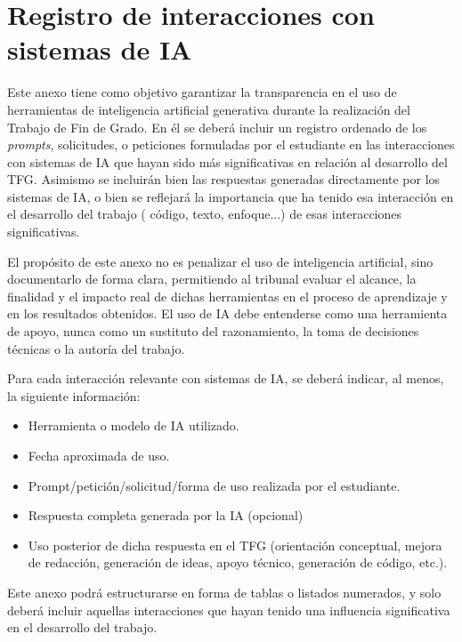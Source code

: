 
\section{Registro de interacciones con sistemas de IA}

Este anexo tiene como objetivo garantizar la transparencia en el uso de
herramientas de inteligencia artificial generativa durante la realización
del Trabajo de Fin de Grado. En él se deberá incluir un registro
ordenado de los \textit{prompts}, solicitudes, o peticiones formuladas por el estudiante en las interacciones con sistemas de IA que hayan sido más significativas en relación al desarrollo del TFG. Asimismo se incluirán bien las respuestas generadas directamente por los sistemas de IA, o bien se reflejará la importancia que ha tenido esa interacción en el desarrollo del trabajo ( código, texto, enfoque...) de esas interacciones significativas.

El propósito de este anexo no es penalizar el uso de inteligencia artificial,
sino documentarlo de forma clara, permitiendo al tribunal evaluar el alcance,
la finalidad y el impacto real de dichas herramientas en el proceso de
aprendizaje y en los resultados obtenidos. El uso de IA debe entenderse como
una herramienta de apoyo, nunca como un sustituto del razonamiento,
la toma de decisiones técnicas o la autoría del trabajo.

Para cada interacción relevante con sistemas de IA, se deberá indicar, al
menos, la siguiente información:
\begin{itemize}
    \item Herramienta o modelo de IA utilizado.
    \item Fecha aproximada de uso.
    \item Prompt/petición/solicitud/forma de uso realizada por el estudiante.
    \item Respuesta completa generada por la IA (opcional)
    \item Uso posterior de dicha respuesta en el TFG (orientación conceptual,
    mejora de redacción, generación de ideas, apoyo técnico, generación de código, etc.).
\end{itemize}

Este anexo podrá estructurarse en forma de tablas o listados numerados, y
solo deberá incluir aquellas interacciones que hayan tenido una influencia
significativa en el desarrollo del trabajo. 